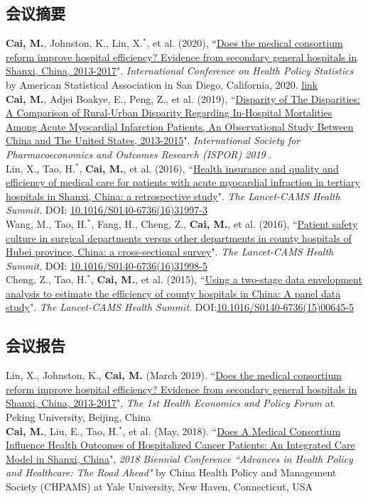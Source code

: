 \documentclass[11pt, a4paper]{article}
\newcommand{\years}[1]{\marginnote{\scriptsize #1}}
\begin{document}
\subsection*{会议摘要}
\noindent
\years{2020}\textbf{Cai, M.}, Johnston, K., Lin, X.$^\ast$, et al. (2020), ``\ul{Does the medical consortium reform improve hospital efficiency? Evidence from secondary general hospitals in Shanxi, China, 2013-2017}". \emph{International Conference on Health Policy Statistics} by American Statistical Association in San Diego, California, 2020. \href{https://ww2.amstat.org/meetings/ichps/2020/onlineprogram/AbstractDetails.cfm?AbstractID=306703}{link}\\[6pt]
\years{2019}\textbf{Cai, M.}, Adjei Boakye, E., Peng, Z., et al. (2019), ``\ul{Disparity of The Disparities: A Comparison of Rural-Urban Disparity Regarding In-Hospital Mortalities Among Acute Myocardial Infarction Patients, An Observational Study Between China and The United States, 2013-2015}". \emph{International Society for Pharmacoeconomics and Outcomes Research (ISPOR) 2019 }. \\[6pt]
\years{2016}Lin, X., Tao, H.$^\ast$, \textbf{Cai, M.}, et al. (2016), ``\ul{Health insurance and quality and efficiency of medical care for patients with acute myocardial infraction in tertiary hospitals in Shanxi, China: a retrospective study}". \emph{The Lancet-CAMS Health Summit}. DOI: \href{https://doi.org/10.1016/S0140-6736(16)31997-3}{10.1016/S0140-6736(16)31997-3}\\[6pt]
\years{2016}Wang, M., Tao, H.$^\ast$, Fang, H., Cheng, Z., \textbf{Cai, M.}, et al. (2016), ``\ul{Patient safety culture in surgical departments versus other departments in county hospitals of Hubei province, China: a cross-sectional survey}". \emph{The Lancet-CAMS Health Summit}. DOI: \href{https://doi.org/10.1016/S0140-6736(16)31998-5}{10.1016/S0140-6736(16)31998-5}\\[6pt]
\years{2015}Cheng, Z., Tao, H.$^\ast$, \textbf{Cai, M.}, et al.  (2015), ``\ul{Using a two-stage data envelopment analysis to estimate the efficiency of county hospitals in China: A panel data study}". \emph{The Lancet-CAMS Health Summit}. DOI:\href{https://doi.org/10.1016/S0140-6736(15)00645-5}{10.1016/S0140-6736(15)00645-5} 

\subsection*{会议报告}
\noindent
\years{2019}Lin, X., Johnston, K., \textbf{Cai, M.} (March 2019). ``\ul{Does the medical consortium reform improve hospital efficiency? Evidence from secondary general hospitals in Shanxi, China, 2013-2017}", \emph{The 1st Health Economics and Policy Forum} at Peking University, Beijing, China\\[6pt]
\years{2018}\textbf{Cai, M.}, Liu, E., Tao, H.$^\ast$, et al. (May, 2018). ``\ul{Does A Medical Consortium Influence Health Outcomes of Hospitalized Cancer Patients: An Integrated Care Model in Shanxi, China}", \emph{2018 Biennial Conference ``Advances in Health Policy and Healthcare: The Road Ahead"} by China Health Policy and Management Society (CHPAMS) at Yale University, New Haven, Connecticut, USA
\end{document}

